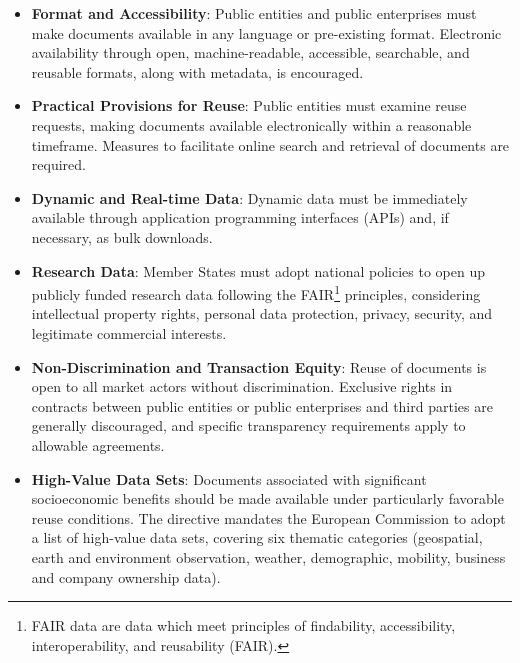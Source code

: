 \begin{itemize}
    \item \textbf{Format and Accessibility}: Public entities and public enterprises must make documents available in any language or pre-existing format. Electronic availability through open, machine-readable, accessible, searchable, and reusable formats, along with metadata, is encouraged.
    \item \textbf{Practical Provisions for Reuse}: Public entities must examine reuse requests, making documents available electronically within a reasonable timeframe. Measures to facilitate online search and retrieval of documents are required.
    \item \textbf{Dynamic and Real-time Data}: Dynamic data must be immediately available through application programming interfaces (APIs) and, if necessary, as bulk downloads.
    \item \textbf{Research Data}: Member States must adopt national policies to open up publicly funded research data following the FAIR\footnote{FAIR data are data which meet principles of findability, accessibility, interoperability, and reusability (FAIR).} principles, considering intellectual property rights, personal data protection, privacy, security, and legitimate commercial interests.
    \item \textbf{Non-Discrimination and Transaction Equity}: Reuse of documents is open to all market actors without discrimination. Exclusive rights in contracts between public entities or public enterprises and third parties are generally discouraged, and specific transparency requirements apply to allowable agreements.

    \item \textbf{High-Value Data Sets}: Documents associated with significant socioeconomic benefits should be made available under particularly favorable reuse conditions. The directive mandates the European Commission to adopt a list of high-value data sets, covering six thematic categories (geospatial, earth and environment observation, weather, demographic, mobility, business and company ownership data).
\end{itemize}

